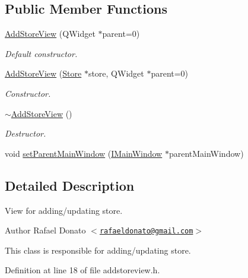 \subsection*{\-Public \-Member \-Functions}
\begin{DoxyCompactItemize}
\item 
\hyperlink{class_add_store_view_aab9fe4aa88776dc43422ce5633717c46}{\-Add\-Store\-View} (\-Q\-Widget $\ast$parent=0)
\begin{DoxyCompactList}\small\item\em \-Default constructor. \end{DoxyCompactList}\item 
\hyperlink{class_add_store_view_a9205fef4237fc0c3779dd25f0cd4fc22}{\-Add\-Store\-View} (\hyperlink{class_store}{\-Store} $\ast$store, \-Q\-Widget $\ast$parent=0)
\begin{DoxyCompactList}\small\item\em \-Constructor. \end{DoxyCompactList}\item 
\hyperlink{class_add_store_view_a74a96ce655651df8fc2656237c7f223a}{$\sim$\-Add\-Store\-View} ()
\begin{DoxyCompactList}\small\item\em \-Destructor. \end{DoxyCompactList}\item 
void \hyperlink{class_add_store_view_ad0956e53d55bc02426ff6ae67aeaa7db}{set\-Parent\-Main\-Window} (\hyperlink{class_i_main_window}{\-I\-Main\-Window} $\ast$parent\-Main\-Window)
\end{DoxyCompactItemize}


\subsection{\-Detailed \-Description}
\-View for adding/updating store. 

\begin{DoxyAuthor}{\-Author}
\-Rafael \-Donato $<$\href{mailto:rafaeldonato@gmail.com}{\tt rafaeldonato@gmail.\-com}$>$
\end{DoxyAuthor}
\-This class is responsible for adding/updating store. 

\-Definition at line 18 of file addstoreview.\-h.




